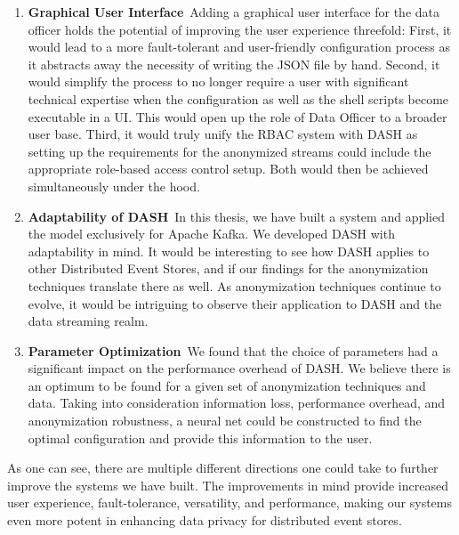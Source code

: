 \begin{enumerate}
\item \textbf{Graphical User Interface}\
Adding a graphical user interface for the data officer holds the potential of improving the user experience threefold: First, it would lead to a more fault-tolerant and user-friendly configuration process as it abstracts away the necessity of writing the JSON file by hand. Second, it would simplify the process to no longer require a user with significant technical expertise when the configuration as well as the shell scripts become executable in a UI. This would open up the role of Data Officer to a broader user base. Third, it would truly unify the \ac{RBAC} system with \ac{DASH} as setting up the requirements for the anonymized streams could include the appropriate role-based access control setup. Both would then be achieved simultaneously under the hood.
\item \textbf{Adaptability of DASH}\
In this thesis, we have built a system and applied the model exclusively for Apache Kafka. We developed \ac{DASH} with adaptability in mind. It would be interesting to see how \ac{DASH} applies to other Distributed Event Stores, and if our findings for the anonymization techniques translate there as well. As anonymization techniques continue to evolve, it would be intriguing to observe their application to \ac{DASH} and the data streaming realm.
\item \textbf{Parameter Optimization}\
We found that the choice of parameters had a significant impact on the performance overhead of \ac{DASH}. We believe there is an optimum to be found for a given set of anonymization techniques and data. Taking into consideration information loss, performance overhead, and anonymization robustness, a neural net could be constructed to find the optimal configuration and provide this information to the user.
\end{enumerate}

As one can see, there are multiple different directions one could take to further improve the systems we have built. The improvements in mind provide increased user experience, fault-tolerance, versatility, and performance, making our systems even more potent in enhancing data privacy for distributed event stores.